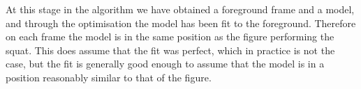 At this stage in the algorithm we have obtained a foreground frame and a model, and through the optimisation the model has been fit to the foreground. Therefore on each frame the model is in the same position as the figure performing the squat. This does assume that the fit was perfect, which in practice is not the case, but the fit is generally good enough to assume that the model is in a position reasonably similar to that of the figure.